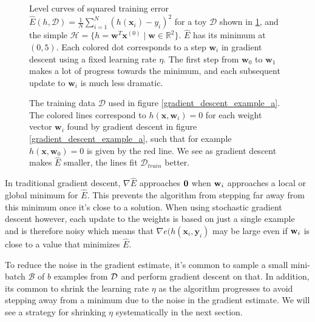 \begin{figure}
	\hspace{9mm}
	\caption{Level curves of squared training error $\hat{E}(h, \mathcal{D}) = \frac{1}{N}\sum_{i=1}^N(h(\mathbf{x}_i) - y_i)^2$ for a toy $\mathcal{D}$ shown in \ref{gradient_descent_example_b}, and the simple $\mathcal{H} = \{h = \mathbf{w}^T\mathbf{x}^{(0)} \mid \mathbf{w} \in \mathbb{R}^2\}$. $\hat{E}$ has its minimum at $(0, 5)$. Each colored dot corresponds to a step $\mathbf{w}_i$ in gradient descent using a fixed learning rate $\eta$. The first step from $\mathbf{w}_0$ to $\mathbf{w}_1$ makes a lot of progress towards the minimum, and each subsequent update to $\mathbf{w}_i$ is much less dramatic.}
	\label{gradient_descent_example_a}
	\vspace{10mm}
	
	\caption{The training data $\mathcal{D}$ used in figure \ref{gradient_descent_example_a}. The colored lines correspond to $h(\mathbf{x}, \mathbf{w}_i) = 0$ for each weight vector $\mathbf{w}_i$ found by gradient descent in figure \ref{gradient_descent_example_a}, such that for example $h(\mathbf{x}, \mathbf{w}_0) = 0$ is given by the red line. We see as gradient descent makes $\hat{E}$ smaller, the lines fit $\mathcal{D}_{train}$ better.}
	\label{gradient_descent_example_b}
\end{figure}
\noindent
In traditional gradient descent, $\nabla \hat{E}$ approaches $\mathbf{0}$ when $\mathbf{w}_i$ approaches a local or global minimum for $\hat{E}$. This prevents the algorithm from stepping far away from this minimum once it's close to a solution. When using stochastic gradient descent however, each update to the weights is based on just a single example and is therefore noisy which means that $\nabla e(h(\mathbf{x}_i, \mathbf{y}_i)$ may be large even if $\mathbf{w}_i$ is close to a value that minimizes $\hat{E}$. 

To reduce the noise in the gradient estimate, it's common to sample a small mini-batch $\mathcal{B}$ of $b$ examples from $\mathcal{D}$ and perform gradient descent on that. In addition, its common to shrink the learning rate $\eta$ as the algorithm progresses to avoid stepping away from a minimum due to the noise in the gradient estimate. We will see a strategy for shrinking $\eta$ systematically in the next section.

